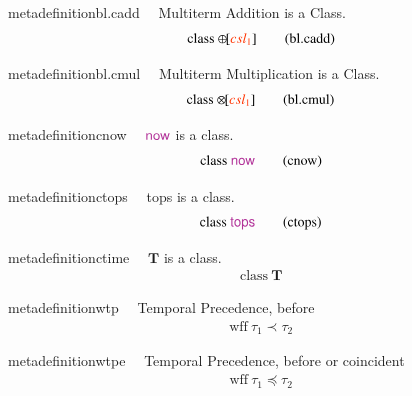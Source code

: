 \begin{restatable}{metadefinition}{bl.cadd}~~ Multiterm Addition is a Class.
\begin{align}
\,\mathrm{class}~ {\oplus\hspace{-1pt}[} \msc{csl_1}
    ]\label{eq:bl.cadd}\tag{bl.cadd}
\end{align}
\end{restatable}

\begin{restatable}{metadefinition}{bl.cmul}~~ Multiterm Multiplication is a Class.
\begin{align}
\,\mathrm{class}~ {\otimes\hspace{-1pt}[} \msc{csl_1}
    ]\label{eq:bl.cmul}\tag{bl.cmul}
\end{align}
\end{restatable}

\begin{restatable}{metadefinition}{cnow}~~ $\mathsf{\mc{now}}$ is a class.
\begin{align}
\,\mathrm{class}~ \mathsf{\mc{now}}\label{eq:cnow}\tag{cnow}
\end{align}
\end{restatable}

\begin{restatable}{metadefinition}{ctops}~~ tops is a class.
\begin{align}
\,\mathrm{class}~ \mathsf{\mc{tops}}\label{eq:ctops}\tag{ctops}
\end{align}
\end{restatable}

\begin{restatable}{metadefinition}{ctime}~~ $\mathbf{T}$ is a class.
\begin{align}
\,\mathrm{class}~ \mathbf{T}\label{eq:ctime}\tag{ctime}
\end{align}
\end{restatable}

\begin{restatable}{metadefinition}{wtp}~~ Temporal Precedence, before
\begin{align}
\,\mathrm{wff}~ \tau_1 \prec \tau_2\label{eq:wtp}\tag{wtp}
\end{align}
\end{restatable}

\begin{restatable}{metadefinition}{wtpe}~~ Temporal Precedence, before or coincident
\begin{align}
\,\mathrm{wff}~ \tau_1 \preccurlyeq \tau_2\label{eq:wtpe}\tag{wtpe}
\end{align}
\end{restatable}

